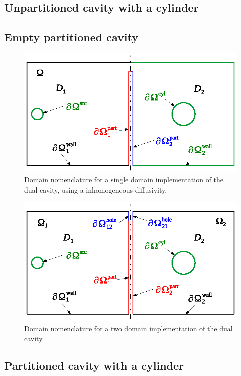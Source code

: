 \documentclass[a4paper]{article}
\numberwithin{equation}{section}
\begin{document}
\subsection[Unpartitioned cavity with a cylinder]{Unpartitioned cavity with a cylinder}
\label{sc:tcs:cylunpart}

\subsection[Empty partitioned cavity]{Empty partitioned cavity}
\label{sc:tcs:emptypart}

\begin{figure}[ht]
\begin{center}
\includegraphics[width=0.6\linewidth]{figures/domains1}
\vspace{-4mm}
\caption{\label{fg:tcdom1} Domain nomenclature for a single domain implementation of the dual cavity, using
a inhomogeneous diffusivity.}
\end{center}
\end{figure}

\begin{figure}[ht]
\begin{center}
\includegraphics[width=0.6\linewidth]{figures/domains2}
\vspace{-4mm}
\caption{\label{fg:tcdom2} Domain nomenclature for a two domain implementation of the dual cavity.}
\end{center}
\end{figure}

\subsection[Partitioned cavity with a cylinder]{Partitioned cavity with a cylinder}
\label{sc:tcs:cylpart}
\end{document}
